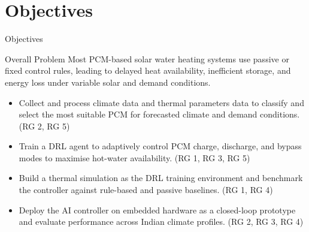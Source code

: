 \documentclass[aspectratio=169, 11pt]{beamer}
\begin{document}
\section{Objectives}
\begin{frame}{Objectives}
\begin{block}{Overall Problem}
Most PCM-based solar water heating systems use passive or fixed control rules, 
leading to delayed heat availability, inefficient storage, and energy loss 
under variable solar and demand conditions.
\end{block}

\begin{itemize}

    \item  Collect and process climate data and thermal parameters data to classify and select the most suitable PCM for forecasted climate and demand conditions.(RG 2, RG 5)

    \item Train a DRL agent to adaptively control PCM charge, discharge, and bypass modes to maximise hot-water availability. (RG 1, RG 3, RG 5)

    \item Build a thermal simulation as the DRL training environment and benchmark the controller against rule-based and passive baselines. (RG 1, RG 4)

    \item Deploy the AI controller on embedded hardware as a closed-loop prototype 
    and evaluate performance across Indian climate profiles. (RG 2, RG 3, RG 4)

\end{itemize}

\end{frame}
\end{document}
